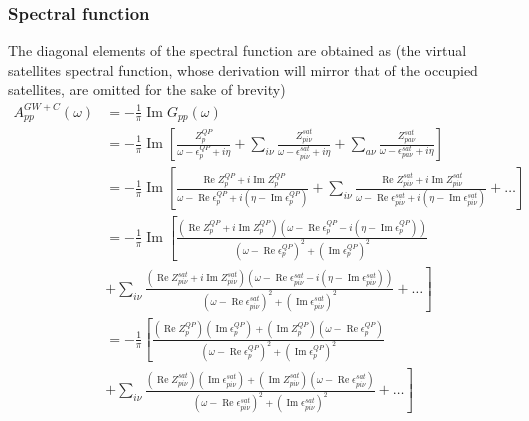 \subsubsection{Spectral function}
The diagonal elements of the spectral function are obtained as (the virtual satellites spectral function, whose derivation will mirror that of the occupied satellites, are omitted for the sake of brevity)
\begin{align}
A_{pp}^{GW+C}(\omega) & = -\frac{1}{\pi} \operatorname{Im} G_{pp}(\omega) \\
& = -\frac{1}{\pi} \operatorname{Im}\left[\frac{Z_p^{QP}}{\omega - \epsilon_p^{QP} + i\eta} + \sum_{i\nu} \frac{Z_{pi\nu}^{sat}}{\omega - \epsilon_{pi\nu}^{sat} + i\eta} + \sum_{a\nu} \frac{Z_{pa\nu}^{sat}}{\omega - \epsilon_{pa\nu}^{sat} + i\eta}\right] \\
& = -\frac{1}{\pi} \operatorname{Im}\left[\frac{\operatorname{Re} Z_p^{QP} + i \operatorname{Im} Z_p^{QP}}{\omega - \operatorname{Re} \epsilon_p^{QP} + i\left(\eta - \operatorname{Im} \epsilon_p^{QP}\right)} + \sum_{i\nu} \frac{\operatorname{Re} Z_{pi\nu}^{sat} + i \operatorname{Im} Z_{pi\nu}^{sat}}{\omega - \operatorname{Re} \epsilon_{pi\nu}^{sat} + i\left(\eta - \operatorname{Im} \epsilon_{pi\nu}^{sat}\right)} + \ldots \right] \\
& = -\frac{1}{\pi} \operatorname{Im}\left[\frac{\left(\operatorname{Re} Z_p^{QP} + i \operatorname{Im} Z_p^{QP}\right)\left(\omega - \operatorname{Re} \epsilon_p^{QP} - i\left(\eta - \operatorname{Im} \epsilon_p^{QP}\right)\right)}{\left(\omega - \operatorname{Re} \epsilon_p^{QP}\right)^2 + \left(\operatorname{Im} \epsilon_p^{QP}\right)^2}\right.\\
& \left. + \sum_{i\nu} \frac{\left(\operatorname{Re} Z_{pi\nu}^{sat} + i \operatorname{Im} Z_{pi\nu}^{sat}\right)\left(\omega - \operatorname{Re} \epsilon_{pi\nu}^{sat} - i\left(\eta - \operatorname{Im} \epsilon_{pi\nu}^{sat}\right)\right)}{\left(\omega - \operatorname{Re} \epsilon_{pi\nu}^{sat}\right)^2 + \left(\operatorname{Im} \epsilon_{pi\nu}^{sat}\right)^2} + \ldots \right] \\
& = -\frac{1}{\pi}\left[\frac{\left(\operatorname{Re} Z_p^{QP}\right)\left(\operatorname{Im} \epsilon_p^{QP}\right) + \left(\operatorname{Im} Z_p^{QP}\right)\left(\omega - \operatorname{Re} \epsilon_p^{QP}\right)}{\left(\omega - \operatorname{Re} \epsilon_p^{QP}\right)^2 + \left(\operatorname{Im} \epsilon_p^{QP}\right)^2}\right.\\
& \left. + \sum_{i\nu} \frac{\left(\operatorname{Re} Z_{pi\nu}^{sat}\right)\left(\operatorname{Im} \epsilon_{pi\nu}^{sat}\right) + \left(\operatorname{Im} Z_{pi\nu}^{sat}\right)\left(\omega - \operatorname{Re} \epsilon_{pi\nu}^{sat}\right)}{\left(\omega - \operatorname{Re} \epsilon_{pi\nu}^{sat}\right)^2 + \left(\operatorname{Im} \epsilon_{pi\nu}^{sat}\right)^2} + \ldots \right]
\end{align}

